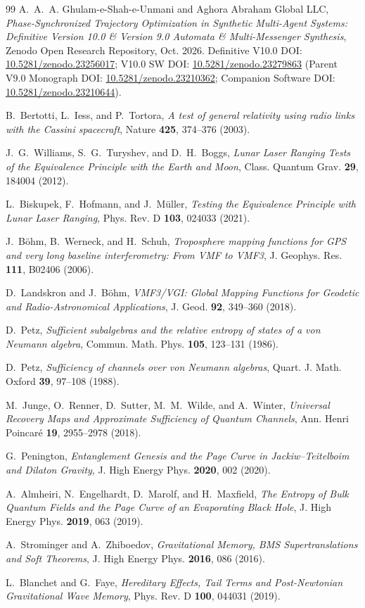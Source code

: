 \documentclass[11pt,a4paper,reqno]{article}
\def\texttt#1{#1}%
\newcommand{\zenodo}[1]{\href{https://doi.org/10.5281/zenodo.#1}{\texttt{10.5281/\allowbreak zenodo.#1}}}
\theoremstyle{plain}
\theoremstyle{definition}
\theoremstyle{remark}
\numberwithin{equation}{section}
\begin{document}
\begin{thebibliography}{99}
A.~A.~A. Ghulam-e-Shah-e-Unmani and {Aghora Abraham Global LLC},
\emph{Phase-Synchronized Trajectory Optimization in Synthetic Multi-Agent Systems: Definitive Version 10.0 \& Version 9.0 Automata \& Multi-Messenger Synthesis},
Zenodo Open Research Repository, Oct. 2026.
Definitive V10.0 DOI: \zenodo{23256017}; V10.0 SW DOI: \zenodo{23279863} (Parent V9.0 Monograph DOI: \zenodo{23210362}; Companion Software DOI: \zenodo{23210644}).

B.~Bertotti, L.~Iess, and P.~Tortora,
\emph{A test of general relativity using radio links with the Cassini spacecraft},
Nature \textbf{425}, 374--376 (2003).

J.~G.~Williams, S.~G.~Turyshev, and D.~H.~Boggs,
\emph{Lunar Laser Ranging Tests of the Equivalence Principle with the Earth and Moon},
Class. Quantum Grav. \textbf{29}, 184004 (2012).

L.~Biskupek, F.~Hofmann, and J.~M\"{u}ller,
\emph{Testing the Equivalence Principle with Lunar Laser Ranging},
Phys. Rev. D \textbf{103}, 024033 (2021).

J.~B\"{o}hm, B.~Werneck, and H.~Schuh,
\emph{Troposphere mapping functions for GPS and very long baseline interferometry: From VMF to VMF3},
J. Geophys. Res. \textbf{111}, B02406 (2006).

D.~Landskron and J.~B\"{o}hm,
\emph{VMF3/VGI: Global Mapping Functions for Geodetic and Radio-Astronomical Applications},
J. Geod. \textbf{92}, 349--360 (2018).

D.~Petz,
\emph{Sufficient subalgebras and the relative entropy of states of a von Neumann algebra},
Commun. Math. Phys. \textbf{105}, 123--131 (1986).

D.~Petz,
\emph{Sufficiency of channels over von Neumann algebras},
Quart. J. Math. Oxford \textbf{39}, 97--108 (1988).

M.~Junge, O.~Renner, D.~Sutter, M.~M.~Wilde, and A.~Winter,
\emph{Universal Recovery Maps and Approximate Sufficiency of Quantum Channels},
Ann. Henri Poincar\'{e} \textbf{19}, 2955--2978 (2018).

G.~Penington,
\emph{Entanglement Genesis and the Page Curve in Jackiw--Teitelboim and Dilaton Gravity},
J. High Energy Phys. \textbf{2020}, 002 (2020).

A.~Almheiri, N.~Engelhardt, D.~Marolf, and H.~Maxfield,
\emph{The Entropy of Bulk Quantum Fields and the Page Curve of an Evaporating Black Hole},
J. High Energy Phys. \textbf{2019}, 063 (2019).

A.~Strominger and A.~Zhiboedov,
\emph{Gravitational Memory, BMS Supertranslations and Soft Theorems},
J. High Energy Phys. \textbf{2016}, 086 (2016).

L.~Blanchet and G.~Faye,
\emph{Hereditary Effects, Tail Terms and Post-Newtonian Gravitational Wave Memory},
Phys. Rev. D \textbf{100}, 044031 (2019).

\end{thebibliography}
\end{document}
